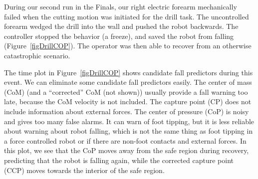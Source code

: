 \documentclass[letterpaper,12pt,fullpage]{article}
\begin{document}
During our second
run in the Finals, our right electric forearm mechanically failed
when the cutting motion was initiated for the drill task. The
uncontrolled forearm wedged the drill into the wall and
pushed the robot backwards.
The controller stopped the behavior (a freeze),
and saved the robot from falling (Figure~\ref{figDrillCOP}).
The operator was then able to
recover from an otherwise catastrophic scenario.

The time plot in Figure~\ref{figDrillCOP} shows candidate fall predictors
during this event. We can eliminate some candidate fall predictors
easily. The center of mass (CoM) (and a ``corrected'' CoM (not shown))
usually provide a fall warning too late, because the CoM velocity is not
included. The capture point (CP) does not include information about
external forces. The center of pressure (CoP) is 
noisy and gives too many false alarms. It can warn of 
foot tipping, but it is less reliable about warning about robot falling,
which is not the same thing as foot tipping in a force controlled robot
or if there are non-foot contacts and external
forces. In this plot, we see that the CoP moves away from the safe region
during recovery, predicting that the robot is falling again, while the
corrected capture point (CCP) moves towards the interior of the safe region.
\end{document}
